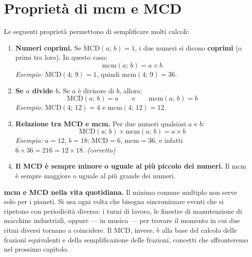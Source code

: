 \section{Proprietà di mcm e MCD}

\begin{regola}
    Le seguenti proprietà permettono di semplificare molti calcoli:

    \begin{enumerate}[leftmargin=1.5em]
        \item \textbf{Numeri coprimi.} Se MCD$(a;\, b) = 1$, i due numeri si dicono
              \textbf{coprimi} (o primi tra loro). In questo caso:
              \[
                  \text{mcm}(a;\, b) = a \times b
              \]
              \textit{Esempio:} MCD$(4;\, 9) = 1$, quindi mcm$(4;\, 9) = 36$.

        \item \textbf{Se $a$ divide $b$.} Se $a$ è divisore di $b$, allora:
              \[
                  \text{MCD}(a;\, b) = a \qquad \text{e} \qquad \text{mcm}(a;\, b) = b
              \]
              \textit{Esempio:} MCD$(4;\, 12) = 4$ e mcm$(4;\, 12) = 12$.

        \item \textbf{Relazione tra MCD e mcm.} Per due numeri qualsiasi $a$ e $b$:
              \[
                  \text{MCD}(a;\, b) \times \text{mcm}(a;\, b) = a \times b
              \]
              \textit{Esempio:} $a = 12$, $b = 18$:
              $\text{MCD} = 6$, $\text{mcm} = 36$,
              e infatti $6 \times 36 = 216 = 12 \times 18$. \quad\textit{(corretto)}

        \item \textbf{Il MCD è sempre minore o uguale al più piccolo dei numeri.}
              Il mcm è sempre maggiore o uguale al più grande dei numeri.
    \end{enumerate}
\end{regola}

\begin{sapevi}
    \textbf{mcm e MCD nella vita quotidiana.}
    Il minimo comune multiplo non serve solo per i pianeti. Si usa ogni volta che
    bisogna sincronizzare eventi che si ripetono con periodicità diversa: i turni
    di lavoro, le finestre di manutenzione di macchine industriali, oppure —
    in musica — per trovare il momento in cui due ritmi diversi tornano a coincidere.
    Il MCD, invece, è alla base del calcolo delle frazioni equivalenti e della
    semplificazione delle frazioni, concetti che affronteremo nel prossimo capitolo.
\end{sapevi}

